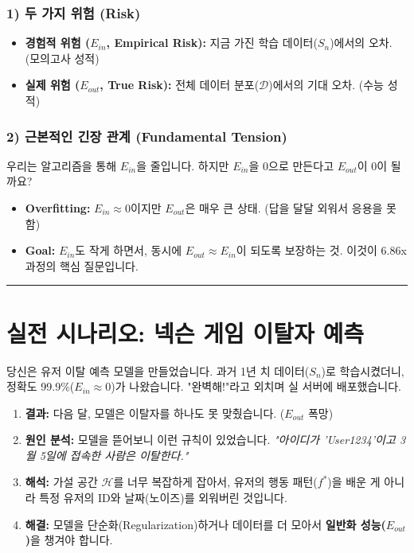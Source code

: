 \documentclass[11pt,a4paper]{book}
\theoremstyle{definition}
\begin{document}
\subsubsection*{1) 두 가지 위험 (Risk)}
\begin{itemize}
    \item \textbf{경험적 위험 ($E_{in}$, Empirical Risk):}
    지금 가진 학습 데이터($S_n$)에서의 오차. (모의고사 성적)
    \item \textbf{실제 위험 ($E_{out}$, True Risk):}
    전체 데이터 분포($\mathcal{D}$)에서의 기대 오차. (수능 성적)
\end{itemize}

\subsubsection*{2) 근본적인 긴장 관계 (Fundamental Tension)}
우리는 알고리즘을 통해 $E_{in}$을 줄입니다. 하지만 $E_{in}$을 0으로 만든다고 $E_{out}$이 0이 될까요?
\begin{itemize}
    \item \textbf{Overfitting:} $E_{in} \approx 0$이지만 $E_{out}$은 매우 큰 상태. (답을 달달 외워서 응용을 못함)
    \item \textbf{Goal:} $E_{in}$도 작게 하면서, 동시에 \textbf{$E_{out} \approx E_{in}$}이 되도록 보장하는 것. 이것이 6.86x 과정의 핵심 질문입니다.
\end{itemize}

\vspace{0.5cm}\hrule\vspace{0.5cm}

\section{실전 시나리오: 넥슨 게임 이탈자 예측}

\begin{storybox}[title={Scenario: 완벽한 예측 모델의 함정}]
당신은 유저 이탈 예측 모델을 만들었습니다.
과거 1년 치 데이터($S_n$)로 학습시켰더니, 정확도 99.9\%($E_{in} \approx 0$)가 나왔습니다.
"완벽해!"라고 외치며 실 서버에 배포했습니다.
\end{storybox}

\begin{enumerate}
    \item \textbf{결과:} 다음 달, 모델은 이탈자를 하나도 못 맞췄습니다. ($E_{out}$ 폭망)
    \item \textbf{원인 분석:} 모델을 뜯어보니 이런 규칙이 있었습니다.
    \textit{"아이디가 'User1234'이고 3월 5일에 접속한 사람은 이탈한다."}
    \item \textbf{해석:} 가설 공간 $\mathcal{H}$를 너무 복잡하게 잡아서, 유저의 행동 패턴($f^*$)을 배운 게 아니라 특정 유저의 ID와 날짜(노이즈)를 외워버린 것입니다.
    \item \textbf{해결:} 모델을 단순화(Regularization)하거나 데이터를 더 모아서 \textbf{일반화 성능($E_{out}$)}을 챙겨야 합니다.
\end{enumerate}
\end{document}
